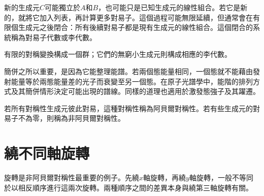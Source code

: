 新的生成元\(C\)可能獨立於\(A\)和\(B\)，也可能只是已知生成元的線性組合。若它是新的，就將它加入列表，再計算更多對易子。這個過程可能無限延續，但通常會在有限個生成元之後閉合：所有後續對易子都是現有生成元的線性組合。這個閉合的系統稱為對易子代數或李代數。

有限的對稱變換構成一個群；它們的無窮小生成元則構成相應的李代數。

簡併之所以重要，是因為它能整理能譜。若兩個態能量相同，一個態就不能藉由發射能量等於兩態能量差的光子而衰變至另一個態。在原子光譜學中，能階的排列方式及其簡併情形決定可能出現的譜線。同樣的道理也適用於激發態強子及其躍遷。

\begin{classroomqa}
\end{classroomqa}

若所有對稱性生成元彼此對易，這種對稱性稱為阿貝爾對稱性。若有些生成元的對易子不為零，則稱為非阿貝爾對稱性。

\begin{classroomqa}
\end{classroomqa}

\begin{classroomqa}
\end{classroomqa}

\section{繞不同軸旋轉}

旋轉是非阿貝爾對稱性最重要的例子。先繞\(x\)軸旋轉，再繞\(y\)軸旋轉，一般不等同於以相反順序進行這兩次旋轉。兩種順序之間的差異本身與繞第三軸旋轉有關。

\begin{classroomqa}
\end{classroomqa}

